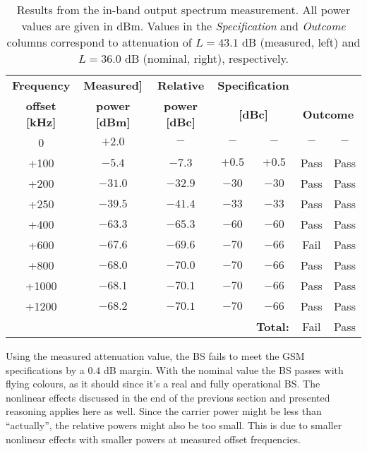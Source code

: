 \documentclass[a4paper, 12pt]{article}
\begin{document}
\begin{table}[!h]
	\begin{center}
	\caption{Results from the in-band output spectrum measurement. 
		All power values are given in dBm. 
		Values in the \textit{Specification} and \textit{Outcome} columns correspond to attenuation of $L = 43.1$ dB (measured, left) and  $L = 36.0$ dB (nominal, right), respectively.}
	\label{tbl:m2}
	\renewcommand*{\arraystretch}{1.2}
	\begin{tabular}{ccccccc}
	\textbf{Frequency} 		& \textbf{Measured]} 		& \textbf{Relative}			& \multicolumn{2}{c}{\textbf{Specification}}		& 	\\
	\textbf{offset [kHz]} 	& \textbf{power [dBm]}		& \textbf{power [dBc]}		& \multicolumn{2}{c}{\textbf{[dBc]} \cite{lab1}}	& \multicolumn{2}{c}{\textbf{Outcome}}	\\
	\hline
	0			& $+2.0$ 	& $-$ 		& $-$		& $-$	 	& $-$	 	& $-$	\\
	+100 		& $-5.4$ 	& $-7.3$ 	& $+0.5$ 	& $+0.5$ 	& \textcolor{dkgrn}{Pass} 		& \textcolor{dkgrn}{Pass} 	\\
	+200		& $-31.0$ 	& $-32.9$ 	& $-30$ 	& $-30$ 	& \textcolor{dkgrn}{Pass} 		& \textcolor{dkgrn}{Pass} 	\\
	+250 		& $-39.5$ 	& $-41.4$ 	& $-33$ 	& $-33$ 	& \textcolor{dkgrn}{Pass} 		& \textcolor{dkgrn}{Pass} 	\\
	+400		& $-63.3$ 	& $-65.3$ 	& $-60$  	& $-60$ 	& \textcolor{dkgrn}{Pass} 		& \textcolor{dkgrn}{Pass} 	\\
	+600		& $-67.6$ 	& $-69.6$ 	& $-70$ 	& $-66$ 	& \textcolor{dkred}{Fail} 		& \textcolor{dkgrn}{Pass}	\\
	+800 		& $-68.0$ 	& $-70.0$ 	& $-70$ 	& $-66$ 	& \textcolor{dkgrn}{Pass} 		& \textcolor{dkgrn}{Pass}	\\
	+1000		& $-68.1$ 	& $-70.1$ 	& $-70$  	& $-66$ 	& \textcolor{dkgrn}{Pass} 		& \textcolor{dkgrn}{Pass}	\\
	+1200		& $-68.2$ 	& $-70.1$ 	& $-70$  	& $-66$ 	& \textcolor{dkgrn}{Pass} 		& \textcolor{dkgrn}{Pass}	\\
	\hline
	\multicolumn{5}{r}{\textbf{Total:}} 						& \textcolor{dkred}{Fail}		& \textcolor{dkgrn}{Pass}
	\end{tabular}
	\end{center}
	\vspace*{-12pt}
\end{table}

Using the measured attenuation value, the BS fails to meet the GSM specifications 
by a $0.4$ dB margin. With the nominal value the BS passes with flying colours, 
as it should since it's a real and fully operational BS. The nonlinear effects 
discussed in the end of the previous section and presented reasoning applies here 
as well. Since the carrier power might be less than ``actually'', the relative 
powers might also be too small. This is due to smaller nonlinear effects with 
smaller powers at measured offset frequencies.
\end{document}
